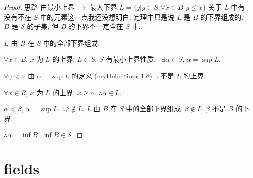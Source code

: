     \begin{proof}
思路 由最小上界 $\rightarrow $ 最大下界
$L = \{y| y\in S; \forall x\in B, y\leq x\}$
    关于 $L$ 中有没有不在 $S$ 中的元素这一点我还没想明白. 定理中只是说 $L$ 是 $B$ 的下界组成的. $B$ 是 $S$ 的子集, 但 $B$ 的下界不一定全在 $S$ 中. 

$L$ 由 $B$ 在 $S$ 中的全部下界组成

$\forall x\in B$, $x$ 为 $L$ 的上界. $L\subset S$.
$S$ 有最小上界性质,
$\therefore \exists \alpha\in S$, $\alpha = \sup L$.

$\forall \gamma <\alpha$ 由 $\alpha = \sup L$ 的定义 (myDefinitions 1.8)
$\gamma$ 不是 $L$ 的上界.

$\forall x \in B$, $x$ 为 $L$ 的上界, $x \geq \alpha$. $\therefore \alpha \in L$.

$\alpha < \beta$, $\alpha = \sup L$. $\therefore \beta \not\in L$.
$L$ 由 $B$ 在 $S$ 中的全部下界组成, $\beta \not\in L$.
$\beta$ 不是 $B$ 的下界.

$\therefore \alpha = \inf B$, $\inf B\in S$.
    \end{proof}


\section{fields}

